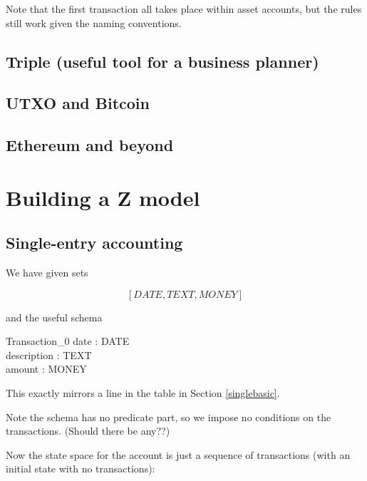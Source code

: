 \documentclass[11pt]{amsart}
\begin{document}
Note that the first transaction all takes place within asset accounts, but the rules still work given the naming conventions.

\subsection{Triple (useful tool for a business planner)}

\subsection{UTXO and Bitcoin}

\subsection{Ethereum and beyond}

%
%
%

\section{Building a Z model}

\subsection{Single-entry accounting}

We have given sets
 
\[
[DATE, TEXT, MONEY]
\]

and the useful schema

\begin{schema}{Transaction_0}
date : DATE\\
description : TEXT\\
amount : MONEY
\end{schema}

This exactly mirrors a line in the table in Section \ref{singlebasic}. 

Note the schema has no predicate part, so we impose no conditions on the transactions. (Should there be any??)

Now the state space for the account is just a sequence of transactions (with an initial state with no transactions):
\end{document}
